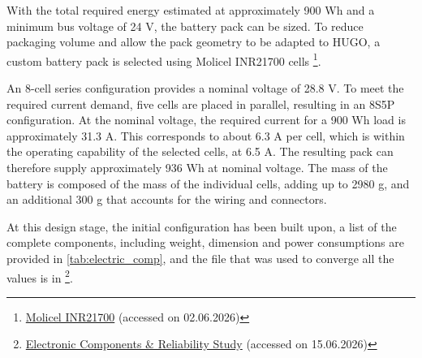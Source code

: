 With the total required energy estimated at approximately 900 Wh and a minimum bus voltage of 24 V, the battery pack can be sized. To reduce packaging volume and allow the pack geometry to be adapted to HUGO, a custom battery pack is selected using Molicel INR21700 cells \footnote{\href{https://www.nkon.nl/en/molicel-inr21700-m65a-6500mah-26a.html}{Molicel INR21700} (accessed on 02.06.2026)}.

An 8-cell series configuration provides a nominal voltage of 28.8 V. To meet the required current demand, five cells are placed in parallel, resulting in an 8S5P configuration. At the nominal voltage, the required current for a 900 Wh load is approximately 31.3 A. This corresponds to about 6.3 A per cell, which is within the operating capability of the selected cells, at 6.5 A. The resulting pack can therefore supply approximately 936 Wh at nominal voltage. The mass of the battery is composed of the mass of the individual cells, adding up to 2980 g, and an additional 300 g that accounts for the wiring and connectors.

At this design stage, the initial configuration has been built upon, a list of the complete components, including weight, dimension and power consumptions are provided in \autoref{tab:electric_comp}, and the file that was used to converge all the values is in \footnote{\href{https://github.com/Teo-Cokonaj/DSE-28/blob/main/docs/excel-files/Electronic\%20Components\%20\%26\%20Reliability\%20Study.xlsx}{Electronic Components \& Reliability Study} (accessed on 15.06.2026)}.


